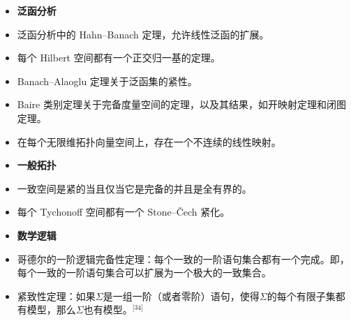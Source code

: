 \begin{itemize}
\item \textbf{泛函分析}  
\item 泛函分析中的 Hahn–Banach 定理，允许线性泛函的扩展。  
\item 每个 Hilbert 空间都有一个正交归一基的定理。  
\item Banach–Alaoglu 定理关于泛函集的紧性。  
\item Baire 类别定理关于完备度量空间的定理，以及其结果，如开映射定理和闭图定理。  
\item 在每个无限维拓扑向量空间上，存在一个不连续的线性映射。
\end{itemize}
\begin{itemize}
\item \textbf{一般拓扑}  
\item 一致空间是紧的当且仅当它是完备的并且是全有界的。  
\item 每个 Tychonoff 空间都有一个 Stone–Čech 紧化。
\end{itemize}
\begin{itemize}
\item \textbf{数学逻辑}  
\item 哥德尔的一阶逻辑完备性定理：每个一致的一阶语句集合都有一个完成。即，每个一致的一阶语句集合可以扩展为一个极大的一致集合。  
\item 紧致性定理：如果\(\Sigma\)是一组一阶（或者零阶）语句，使得\(\Sigma\)的每个有限子集都有模型，那么\(\Sigma\)也有模型。\(^\text{[34]}\)
\end{itemize}
